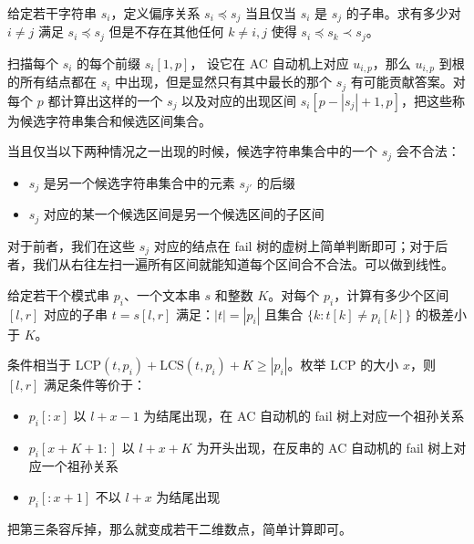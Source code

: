 \begin{exercise}[CF1483F Exam]
    给定若干字符串 $s_i$，定义偏序关系 $s_i\preceq s_j$ 当且仅当 $s_i$ 是 $s_j$ 的子串。求有多少对 $i\ne j$ 满足 $s_i\preceq s_j$ 但是不存在其他任何 $k\ne i,j$ 使得 $s_i\preceq s_k\prec s_j$。
\end{exercise}
\begin{solution}
    扫描每个 $s_i$ 的每个前缀 $s_i[1,p]$， 设它在 AC 自动机上对应 $u_{i,p}$，那么 $u_{i,p}$ 到根的所有结点都在 $s_i$ 中出现，但是显然只有其中最长的那个 $s_j$ 有可能贡献答案。对每个 $p$ 都计算出这样的一个 $s_j$ 以及对应的出现区间 $s_i[p-|s_j|+1,p]$，把这些称为候选字符串集合和候选区间集合。
    
    当且仅当以下两种情况之一出现的时候，候选字符串集合中的一个 $s_j$ 会不合法：
    \begin{itemize}
        \item $s_j$ 是另一个候选字符串集合中的元素 $s_{j'}$ 的后缀
        \item $s_j$ 对应的某一个候选区间是另一个候选区间的子区间
    \end{itemize}

    对于前者，我们在这些 $s_j$ 对应的结点在 fail 树的虚树上简单判断即可；对于后者，我们从右往左扫一遍所有区间就能知道每个区间合不合法。可以做到线性。
\end{solution}

\begin{exercise}[{[HAOI2017] 字符串}]
    给定若干个模式串 $p_i$、一个文本串 $s$ 和整数 $K$。对每个 $p_i$，计算有多少个区间 $[l,r]$ 对应的子串 $t=s[l,r]$ 满足：$|t|=|p_i|$ 且集合 $\{k:t[k]\ne p_i[k]\}$ 的极差小于 $K$。
\end{exercise}
\begin{solution}
    条件相当于 $\mathrm{LCP}(t,p_i)+\mathrm{LCS}(t,p_i)+K\ge |p_i|$。枚举 $\mathrm{LCP}$ 的大小 $x$，则 $[l,r]$ 满足条件等价于：
    \begin{itemize}
        \item $p_i[:x]$ 以 $l+x-1$ 为结尾出现，在 AC 自动机的 fail 树上对应一个祖孙关系
        \item $p_i[x+K+1:]$ 以 $l+x+K$ 为开头出现，在反串的 AC 自动机的 fail 树上对应一个祖孙关系
        \item $p_i[:x+1]$ 不以 $l+x$ 为结尾出现
    \end{itemize}
    把第三条容斥掉，那么就变成若干二维数点，简单计算即可。
\end{solution}


